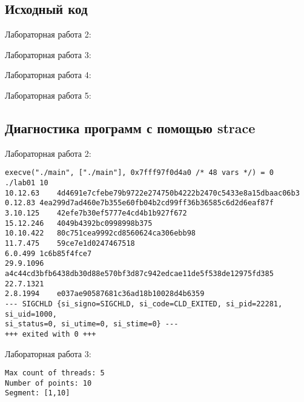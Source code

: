\documentclass[12pt]{article}
\begin{document}
\subsection*{Исходный код}

{
\footnotesize
Лабораторная работа 2:


Лабораторная работа 3:


Лабораторная работа 4:


Лабораторная работа 5:

\subsection*{Диагностика программ с помощью strace}

Лабораторная работа 2:
{
\scriptsize

\begin{lstlisting}[escapechar=!]
execve("./main", ["./main"], 0x7fff97f0d4a0 /* 48 vars */) = 0
./lab01 10
10.12.63	4d4691e7cfebe79b9722e274750b4222b2470c5433e8a15dbaac06b3
0.12.83	4ea299d7ad460e7b355e60fb04b2cd99ff36b36585c6d2d6eaf87f
3.10.125	42efe7b30ef5777e4cd4b1b927f672
15.12.246	4049b4392bc0998998b375
10.10.422	80c751cea9992cd8560624ca306ebb98
11.7.475	59ce7e1d0247467518
6.0.499	1c6b85f4fce7
29.9.1096	a4c44cd3bfb6438db30d88e570bf3d87c942edcae11de5f538de12975fd385
22.7.1321	
2.8.1994	e037ae90587681c36ad18b10028d4b6359
--- SIGCHLD {si_signo=SIGCHLD, si_code=CLD_EXITED, si_pid=22281, si_uid=1000, 
si_status=0, si_utime=0, si_stime=0} ---
+++ exited with 0 +++
\end{lstlisting}
}
Лабораторная работа 3:
{
\scriptsize

\begin{lstlisting}[escapechar=!]
Max count of threads: 5
Number of points: 10
Segment: [1,10]


\end{lstlisting}}}
\end{document}
